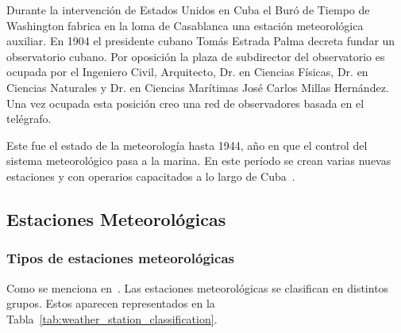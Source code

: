 \documentclass[12pt,letterpaper]{article}
\begin{document}
\begin{sloppypar}
        Durante la intervención de Estados Unidos en Cuba el Buró de Tiempo de
        Washington fabrica en la loma de Casablanca una estación meteorológica
        auxiliar.
        En 1904 el presidente cubano Tomás Estrada Palma decreta fundar un
        observatorio
        cubano.
        Por oposición la plaza de subdirector del observatorio es ocupada por el
        Ingeniero Civil, Arquitecto, Dr.
        en Ciencias Físicas, Dr. en Ciencias Naturales
        y Dr. en Ciencias Marítimas José Carlos Millas Hernández.
        Una vez ocupada esta posición creo una red de observadores basada en el
        telégrafo.

        Este fue el estado de la meteorología hasta 1944, año en que el
        control del
        sistema meteorológico pasa a la marina.
        En este período se crean varias nuevas estaciones y con operarios
        capacitados a
        lo largo de Cuba~\cite{cubaHistoriaMeteorologiaCuba}.

        \subsection{Estaciones Meteorológicas}

        \subsubsection{Tipos de estaciones meteorológicas}
        Como se
        menciona
        en~\cite{palaguachiencaladasoniaisabelDISENODESARROLLOIMPLEMENTACION2018}.
        Las estaciones meteorológicas se clasifican en distintos grupos.
        Estos aparecen representados en la
        Tabla~\ref{tab:weather_station_classification}.


\end{sloppypar}
\end{document}
